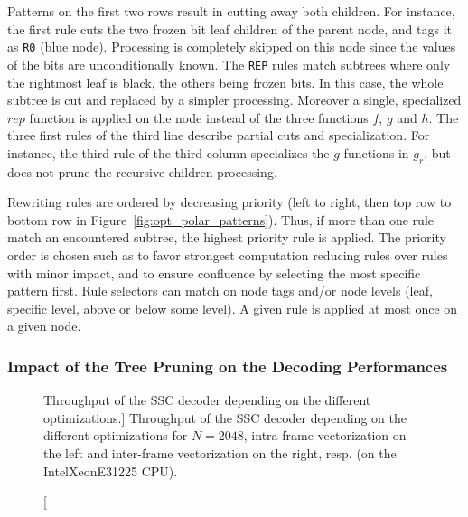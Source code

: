 Patterns on the first two rows result in cutting away both children. For
instance, the first rule cuts the two frozen bit leaf children of the parent
node, and tags it as \verb|R0| (blue node). Processing is completely skipped on
this node since the values of the bits are unconditionally known. The \verb|REP|
rules match subtrees where only the rightmost leaf is black, the others being
frozen bits. In this case, the whole subtree is cut and replaced by a simpler
processing. Moreover a single, specialized $rep$ function is applied on the node
instead of the three functions $f$, $g$ and $h$. The three first rules of the
third line describe partial cuts and specialization. For instance, the third
rule of the third column specializes the $g$ functions in $g_r$, but does not
prune the recursive children processing.

Rewriting rules are ordered by decreasing priority (left to right, then top row
to bottom row in Figure~\ref{fig:opt_polar_patterns}). Thus, if more than one
rule match an encountered subtree, the highest priority rule is applied. The
priority order is chosen such as to favor strongest computation reducing rules
over rules with minor impact, and to ensure confluence by selecting the most
specific pattern first. Rule selectors can match on node tags and/or node levels
(leaf, specific level, above or below some level). A given rule is applied at
most once on a given node.

\subsubsection{Impact of the Tree Pruning on the Decoding Performances}

\begin{figure}[htp]
  \centering
  \quad
  \caption
    [Throughput of the SSC decoder depending on the different optimizations.]
    {Throughput of the SSC decoder depending on the different optimizations for
    $N = 2048$, intra-frame vectorization on the left and inter-frame
    vectorization on the right, resp. (on the Intel\R Xeon\TM E31225 CPU).}
  \label{plot:opt_polar_sc_tree_cut}
\end{figure}

